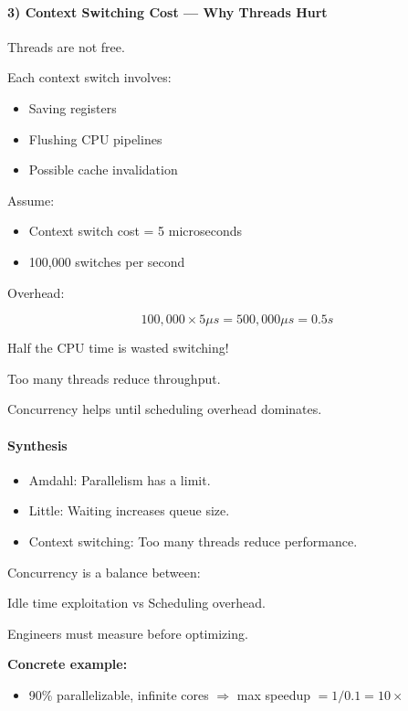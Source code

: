 \documentclass[11pt,a4paper]{article}
\begin{document}
\paragraph{3) Context Switching Cost --- Why Threads Hurt}

Threads are not free.

Each context switch involves:

\begin{itemize}
	\item Saving registers
	\item Flushing CPU pipelines
	\item Possible cache invalidation
\end{itemize}

Assume:
\begin{itemize}
	\item Context switch cost = 5 microseconds
	\item 100,000 switches per second
\end{itemize}

Overhead:

\[
100{,}000 \times 5 \mu s = 500{,}000 \mu s = 0.5s
\]

Half the CPU time is wasted switching!

Too many threads reduce throughput.

Concurrency helps until scheduling overhead dominates.

\paragraph{Synthesis}

\begin{itemize}
	\item Amdahl: Parallelism has a limit.
	\item Little: Waiting increases queue size.
	\item Context switching: Too many threads reduce performance.
\end{itemize}

Concurrency is a balance between:
\begin{center}
	Idle time exploitation \quad vs \quad Scheduling overhead.
\end{center}

Engineers must measure before optimizing.


\textbf{Concrete example:}
\begin{itemize}[leftmargin=*]
	\item 90\% parallelizable, infinite cores $\Rightarrow$ max speedup $= 1/0.1 = 10\times$
\end{itemize}
\end{document}
